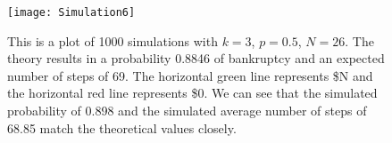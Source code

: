 \documentclass{article}
\begin{document}
\begin{figure}[r]
    \centering
    \texttt{[image: Simulation6]}
    \caption{This is a plot of 1000 simulations with $k = 3$, $p = 0.5$, $N = 26$. The theory results in a probability 0.8846 of bankruptcy and an expected number of steps of 69. The horizontal green line represents \$N and the horizontal red line represents \$0. We can see that the simulated probability of 0.898 and the simulated average number of steps of 68.85 match the theoretical values closely.}
    \label{fig:sim6}
\end{figure}

%
%

\end{document}
